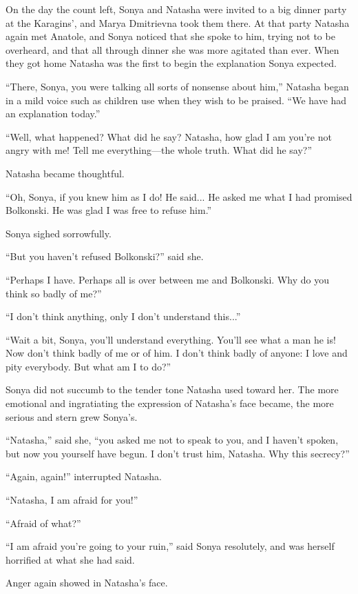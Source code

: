 On the day the count left, Sonya and Natasha were invited to a
big dinner party at the Karagins', and Marya Dmitrievna took them
there. At that party Natasha again met Anatole, and Sonya noticed
that she spoke to him, trying not to be overheard, and that all
through dinner she was more agitated than ever. When they got
home Natasha was the first to begin the explanation Sonya
expected.

``There, Sonya, you were talking all sorts of nonsense about
him,'' Natasha began in a mild voice such as children use when
they wish to be praised. ``We have had an explanation today.''

``Well, what happened? What did he say? Natasha, how glad I am
you're not angry with me! Tell me everything---the whole
truth. What did he say?''

Natasha became thoughtful.

``Oh, Sonya, if you knew him as I do! He said... He asked me what
I had promised Bolkonski. He was glad I was free to refuse him.''

Sonya sighed sorrowfully.

``But you haven't refused Bolkonski?'' said she.

``Perhaps I have. Perhaps all is over between me and
Bolkonski. Why do you think so badly of me?''

``I don't think anything, only I don't understand this...''

``Wait a bit, Sonya, you'll understand everything. You'll see
what a man he is! Now don't think badly of me or of him. I don't
think badly of anyone: I love and pity everybody. But what am I
to do?''

Sonya did not succumb to the tender tone Natasha used toward
her. The more emotional and ingratiating the expression of
Natasha's face became, the more serious and stern grew Sonya's.

``Natasha,'' said she, ``you asked me not to speak to you, and I
haven't spoken, but now you yourself have begun. I don't trust
him, Natasha. Why this secrecy?''

``Again, again!'' interrupted Natasha.

``Natasha, I am afraid for you!''

``Afraid of what?''

``I am afraid you're going to your ruin,'' said Sonya resolutely,
and was herself horrified at what she had said.

Anger again showed in Natasha's face.

